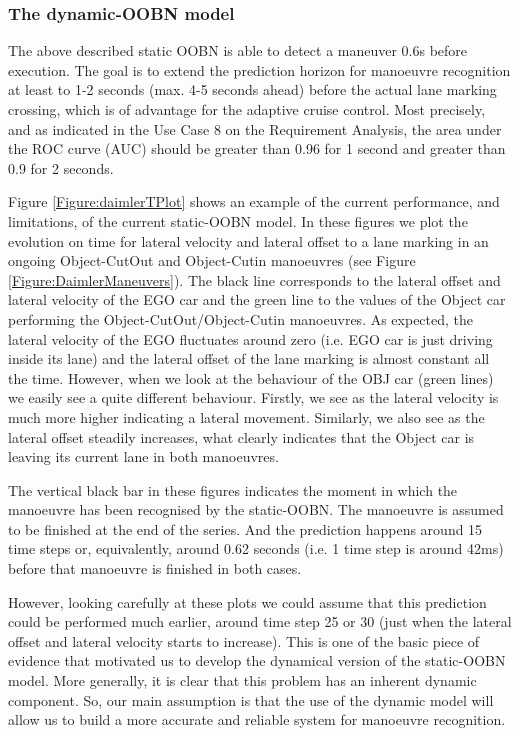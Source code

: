 \subsubsection*{The dynamic-OOBN model}

The above described static OOBN is able to detect a maneuver 0.6s before execution. The goal is to extend the prediction horizon for manoeuvre recognition at least to 1-2 seconds (max. 4-5 seconds ahead) before the actual lane marking crossing, which is of advantage for the adaptive cruise control. Most precisely, and as indicated in the Use Case 8 on the Requirement Analysis,  the area under the ROC curve (AUC) should be greater than 0.96 for 1 second and greater than 0.9 for 2 seconds.

Figure \ref{Figure:daimlerTPlot} shows an example of the current performance, and limitations, of the current static-OOBN model. In these figures we plot the evolution on time for lateral velocity and lateral offset to a lane marking in an ongoing Object-CutOut and Object-Cutin manoeuvres (see Figure \ref{Figure:DaimlerManeuvers}). The black line corresponds to the lateral offset and lateral velocity of the EGO car and the green line to the values of the Object car performing the Object-CutOut/Object-Cutin manoeuvres. As expected, the lateral velocity of the EGO fluctuates around zero  (i.e. EGO car is just driving inside its lane) and the lateral offset of the lane marking is almost constant all the time. However, when we look at the behaviour of the OBJ car (green lines) we easily see a quite different behaviour. Firstly, we see as the lateral velocity is much more higher indicating a lateral movement. Similarly, we also see as the lateral offset steadily increases, what clearly indicates that the Object car is leaving its current lane in both manoeuvres. 

The vertical black bar in these figures indicates the moment in which the manoeuvre has been recognised by the static-OOBN. The manoeuvre is assumed to be finished at the end of the series. And the prediction happens around 15 time steps  or, equivalently, around 0.62 seconds (i.e. 1 time step is around 42ms) before that manoeuvre is finished in both cases. 


However, looking carefully at these plots we could assume that this prediction could be performed much earlier, around time step 25 or 30 (just when the lateral offset and lateral velocity starts to increase). This is one of the basic piece of evidence that motivated us to develop the dynamical version of the static-OOBN model. More generally, it is clear that this problem has an inherent dynamic component. So, our main assumption is that the use of the dynamic model will allow us to build a more accurate and reliable system for manoeuvre recognition. 


